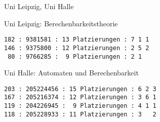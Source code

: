 \begin{slide}{Uni Leipzig, Uni Halle}

Uni Leipzig: Berechenbarkeitstheorie
\begin{verbatim}
182 : 9381581 : 13 Platzierungen : 7 1 1
146 : 9375800 : 12 Platzierungen : 2 5 2
 80 : 9766285 :  9 Platzierungen : 2 1    
\end{verbatim}

\bigskip

Uni Halle: Automaten und Berechenbarkeit
\begin{verbatim}
203 : 205224456 : 15 Platzierungen : 6 2 3
167 : 205216374 : 12 Platzierungen : 3 6 1
119 : 204226945 :  9 Platzierungen : 4 1 1
118 : 205228933 : 11 Platzierungen : 3   2
\end{verbatim}

\end{slide}
